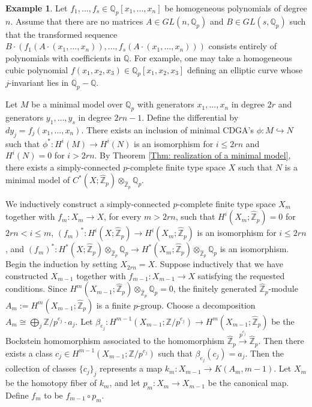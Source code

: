 \documentclass[11pt]{amsart}
\theoremstyle{definition}
\newtheorem{example}[theorem]{Example}
\numberwithin{equation}{section}
\numberwithin{equation}{section}
\newcommand\QQ{\mathbb{Q}}
\newcommand\ZZ{\mathbb{Z}}
\begin{document}
\begin{example}\label{Example: p-complete space which is not a finite type space}
Let $f_1,...,f_s\in \QQ_p[x_1,...,x_n]$ be homogeneous polynomials of degree $n$. Assume that there are no matrices $A\in GL(n,\QQ_p)$ and $B\in GL(s,\QQ_p)$  such that the transformed sequence $B\cdot (f_1(A\cdot (x_1,...,x_n)),...,f_s(A\cdot (x_1,...,x_n)))$ consists entirely of polynomials with coefficients in $\QQ$. For example, one may take a homogeneous cubic polynomial $f(x_1,x_2,x_3)\in \QQ_p[x_1,x_2,x_3]$ defining an elliptic curve whose $j$-invariant lies in $\QQ_p-\QQ$.

Let $M$ be a minimal model over $\QQ_p$ with generators $x_1,...,x_n$ in degree $2r$ and generators $y_1,...,y_s$ in degree $2rn-1$. Define the differential by $dy_j=f_j(x_1,...,x_n)$. 
There exists an inclusion of minimal CDGA's $\phi:M\hookrightarrow N$ such that $\phi^*:H^i(M)\rightarrow H^i(N)$ is an isomorphism for $i\leq 2rn$ and $H^i(N)=0$ for $i>2rn$. By Theorem \ref{Thm: realization of a minimal model}, there exists a simply-connected $p$-complete finite type space $X$ such that $N$ is a minimal model of $C^*(X;\widehat{\ZZ}_p)\otimes_{\widehat{\ZZ}_p} \QQ_p$. 

We inductively construct a simply-connected $p$-complete finite type space $X_{m}$ together with $f_m:X_m\rightarrow X$, for every $m> 2rn$, such that $H^i(X_m;\widehat{\ZZ}_p)=0$ for $2rn<i\leq m$, $(f_m)^*:H^i(X;\widehat{\ZZ}_p)\rightarrow H^i(X_m;\widehat{\ZZ}_p)$ is an isomorphism for $i\leq 2rn$, and $(f_m)^*:H^*(X;\widehat{\ZZ}_p)\otimes_{\widehat{\ZZ}_p}\QQ_p\rightarrow H^*(X_m;\widehat{\ZZ}_p)\otimes_{\widehat{\ZZ}_p}\QQ_p$ is an isomorphism. Begin the induction by setting $X_{2rn}=X$. Suppose inductively that we have constructed $X_{m-1}$ together with $f_{m-1}:X_{m-1}\rightarrow X$ satisfying the requested conditions. Since $H^m(X_{m-1};\widehat{\ZZ}_p)\otimes_{\widehat{\ZZ}_p}\QQ_p=0$, the finitely generated $\widehat{\ZZ}_p$-module $A_m:=H^m(X_{m-1};\widehat{\ZZ}_p)$ is a finite $p$-group. Choose a decomposition $A_m\cong \bigoplus_{j}\ZZ/p^{e_j}\cdot a_j$. Let $\beta_{e_j}:H^{m-1}(X_{m-1};\ZZ/p^{e_j})\rightarrow H^m(X_{m-1};\widehat{\ZZ}_p)$ be the Bockstein homomorphism associated to the homomorphism  $\widehat{\ZZ}_p\xrightarrow{p^{e_j}} \widehat{\ZZ}_p$. Then there exists a class $c_j\in H^{m-1}(X_{m-1};\ZZ/p^{e_j})$ such that $\beta_{e_j}(c_j)=a_j$. Then the collection of classes $\{c_j\}_j$ represents a map $k_m:X_{m-1}\rightarrow K(A_m,m-1)$. Let $X_m$ be the homotopy fiber of $k_m$, and let $p_m:X_m\rightarrow X_{m-1}$ be the canonical map. Define $f_m$ to be $f_{m-1}\circ p_m$.


\end{example}
\end{document}
